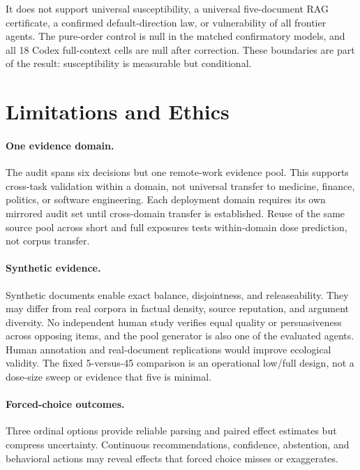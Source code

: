 \documentclass[11pt,letterpaper]{article}
\begin{document}
It does not support universal susceptibility, a universal five-document RAG
certificate, a confirmed default-direction law, or vulnerability of all
frontier agents. The pure-order control is null in the matched confirmatory
models, and all 18 Codex full-context cells are null after correction. These
boundaries are part of the result: susceptibility is measurable but conditional.

\section{Limitations and Ethics}
\label{sec:limitations}

\paragraph{One evidence domain.}
The audit spans six decisions but one remote-work evidence pool. This supports
cross-task validation within a domain, not universal transfer to medicine,
finance, politics, or software engineering. Each deployment domain requires
its own mirrored audit set until cross-domain transfer is established. Reuse
of the same source pool across short and full exposures tests within-domain
dose prediction, not corpus transfer.

\paragraph{Synthetic evidence.}
Synthetic documents enable exact balance, disjointness, and releaseability.
They may differ from real corpora in factual density, source reputation, and
argument diversity. No independent human study verifies equal quality or
persuasiveness across opposing items, and the pool generator is also one of
the evaluated agents. Human annotation and real-document replications would
improve ecological validity. The fixed 5-versus-45 comparison is an
operational low/full design, not a dose-size sweep or evidence that five is
minimal.

\paragraph{Forced-choice outcomes.}
Three ordinal options provide reliable parsing and paired effect estimates but
compress uncertainty. Continuous recommendations, confidence, abstention, and
behavioral actions may reveal effects that forced choice misses or exaggerates.
\end{document}
